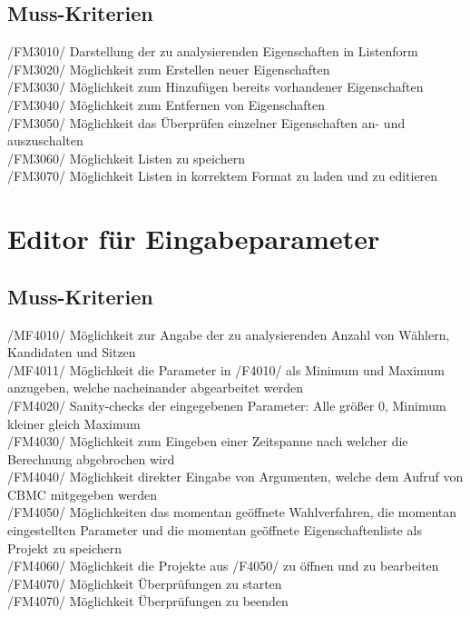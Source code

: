 \documentclass[a4paper]{scrreprt}
\begin{document}
\subsection{Muss-Kriterien}
/FM3010/ Darstellung der zu analysierenden Eigenschaften in Listenform \\
/FM3020/ Möglichkeit zum Erstellen neuer Eigenschaften \\
/FM3030/ Möglichkeit zum Hinzufügen bereits vorhandener Eigenschaften \\
/FM3040/ Möglichkeit zum Entfernen von Eigenschaften \\
/FM3050/ Möglichkeit das Überprüfen einzelner Eigenschaften an- und auszuschalten \\
/FM3060/ Möglichkeit Listen zu speichern \\
/FM3070/ Möglichkeit Listen in korrektem Format zu laden und zu editieren \\


\section{Editor für Eingabeparameter}
\subsection{Muss-Kriterien}
/MF4010/ Möglichkeit zur Angabe der zu analysierenden Anzahl von Wählern, Kandidaten und Sitzen \\
/MF4011/ Möglichkeit die Parameter in /F4010/ als Minimum und Maximum anzugeben, welche nacheinander abgearbeitet werden \\
/FM4020/ Sanity-checks der eingegebenen Parameter: Alle größer 0, Minimum kleiner gleich Maximum \\
/FM4030/ Möglichkeit zum Eingeben einer Zeitspanne nach welcher die Berechnung abgebrochen wird \\
/FM4040/ Möglichkeit direkter Eingabe von Argumenten, welche dem Aufruf von CBMC mitgegeben werden \\
/FM4050/ Möglichkeiten das momentan geöffnete Wahlverfahren, die momentan eingestellten Parameter und die momentan geöffnete Eigenschaftenliste als Projekt zu speichern \\
/FM4060/ Möglichkeit die Projekte aus /F4050/ zu öffnen und zu bearbeiten \\
/FM4070/ Möglichkeit Überprüfungen zu starten \\
/FM4070/ Möglichkeit Überprüfungen zu beenden \\
\end{document}
